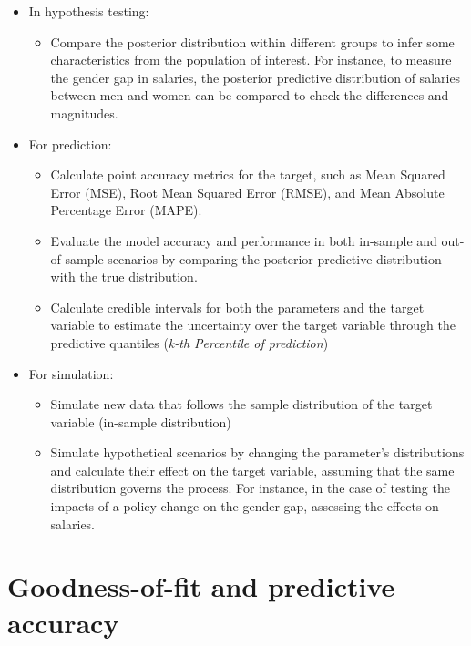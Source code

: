 \begin{itemize}
    \item In hypothesis testing:
    \begin{itemize}
        \item Compare the posterior distribution within different groups to infer some characteristics from the population of interest. For instance, to measure the gender gap in salaries, the posterior predictive distribution of salaries between men and women can be compared to check the differences and magnitudes. 
    \end{itemize}
    \item For prediction: 
    \begin{itemize}
        \item Calculate point accuracy metrics for the target, such as Mean Squared Error (MSE), Root Mean Squared Error (RMSE), and Mean Absolute Percentage Error (MAPE). 

        \item Evaluate the model accuracy and performance in both in-sample and out-of-sample scenarios by comparing the posterior predictive distribution with the true distribution. 
        
        \item Calculate credible intervals for both the parameters and the target variable to estimate the uncertainty over the target variable through the predictive quantiles (\textit{k-th Percentile of prediction}) 
    \end{itemize}
    \item For simulation:
    \begin{itemize}
        \item Simulate new data that follows the sample distribution of the target variable (in-sample distribution) 

        \item Simulate hypothetical scenarios by changing the parameter's distributions and calculate their effect on the target variable, assuming that the same distribution governs the process. For instance, in the case of testing the impacts of a policy change on the gender gap, assessing the effects on salaries. 
    \end{itemize}
\end{itemize}

\section{Goodness-of-fit and predictive accuracy }\label{section:goodness_of_fit}

